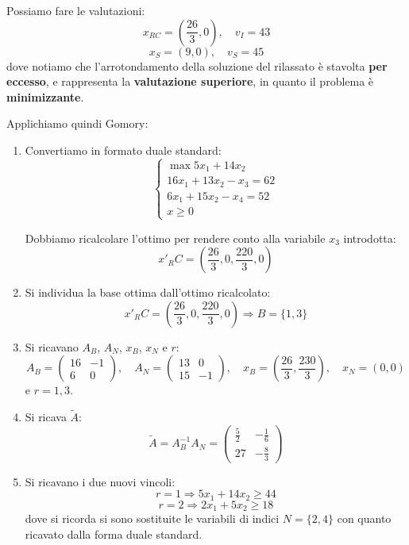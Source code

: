 \documentclass[a4paper,11pt]{article}
\begin{document}
Possiamo fare le valutazioni:
$$
x_{RC} = \left( \frac{26}{3}, 0 \right), \quad v_I = 43
$$
$$
x_S = (9, 0), \quad v_S = 45
$$
dove notiamo che l'arrotondamento della soluzione del rilassato è stavolta \textbf{per eccesso}, e rappresenta la \textbf{valutazione superiore}, in quanto il problema è \textbf{minimizzante}.

Applichiamo quindi Gomory:

\begin{enumerate}
	\item Convertiamo in formato duale standard:
		\[
			\begin{cases}
				\max 5 x_1 + 14 x_2 \\ 
				16 x_1 + 13 x_2 - x_3 = 62 \\ 
				6 x_1 + 15 x_2 - x_4 = 52 \\ 
				x \geq 0
			\end{cases}
		\]

Dobbiamo ricalcolare l'ottimo per rendere conto alla variabile $x_3$ introdotta:
$$
x'_RC = \left( \frac{26}{3}, 0, \frac{220}{3}, 0 \right) 
$$

\item Si individua la base ottima dall'ottimo ricalcolato:
$$
x'_RC = \left( \frac{26}{3}, 0, \frac{220}{3}, 0 \right) \Rightarrow B = \{1, 3 \}
$$

\item Si ricavano $A_B$, $A_N$, $x_B$, $x_N$ e $r$:
$$
A_B = \begin{pmatrix}
	16 & -1 \\ 
	6 & 0
\end{pmatrix}, \quad A_N =
\begin{pmatrix}
	13 & 0 \\ 
	15 & -1
\end{pmatrix}, \quad x_B = \left( \frac{26}{3}, \frac{230}{3} \right), \quad x_N = (0,0)
$$
e $r = 1,3$.

\item Si ricava $\tilde{A}$:
$$
	\tilde{A} = A_B^{-1}A_N = 
	\begin{pmatrix}
		\frac{5}{2} & -\frac{1}{6} \\ 
		27 & -\frac{8}{3}
	\end{pmatrix} 
$$

\item Si ricavano i due nuovi vincoli:
$$
r = 1 \Rightarrow 5 x_1 + 14 x_2 \geq 44 
$$
$$
r = 2 \Rightarrow 2 x_1 + 5 x_2 \geq 18
$$
dove si ricorda si sono sostituite le variabili di indici $N = \{ 2, 4 \}$ con quanto ricavato dalla forma duale standard.

\end{enumerate}
\end{document}
